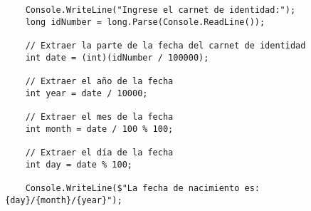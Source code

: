\begin{lstlisting}
    Console.WriteLine("Ingrese el carnet de identidad:");
    long idNumber = long.Parse(Console.ReadLine());
    
    // Extraer la parte de la fecha del carnet de identidad
    int date = (int)(idNumber / 100000);
    
    // Extraer el año de la fecha
    int year = date / 10000;
    
    // Extraer el mes de la fecha
    int month = date / 100 % 100;
    
    // Extraer el día de la fecha
    int day = date % 100;
    
    Console.WriteLine($"La fecha de nacimiento es: {day}/{month}/{year}");
\end{lstlisting}